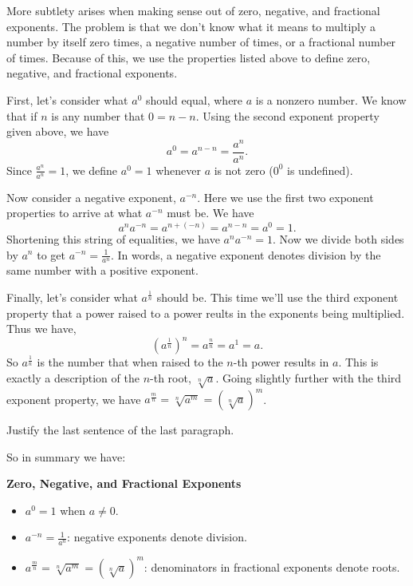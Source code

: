 More subtlety arises when making sense out of zero, negative, and fractional exponents. The problem is that we don't know what it means to multiply a number by itself zero times, a negative number of times, or a fractional number of times. Because of this, we  use the properties listed above to define zero, negative, and fractional exponents.
\par
First, let's consider what $a^0$ should equal, where $a$ is a nonzero number. We know that if $n$ is any number that $0 = n-n$. Using the second exponent property given above, we have
\[
a^0 = a^{n-n} = \frac{a^n}{a^n}.
\]
Since $\frac{a^n}{a^n} = 1$, we define $a^0 = 1$ whenever $a$ is not zero ($0^0$ is undefined).
\par 
Now consider a negative exponent, $a^{-n}$. Here we use the first two exponent properties to arrive at what $a^{-n}$ must be. We have
\[
a^{n}a^{-n} = a^{n+(-n)} = a^{n-n} = a^{0} = 1.
\]
Shortening this string of equalities, we have $a^{n}a^{-n} = 1$. Now we divide both sides by $a^{n}$ to get $a^{-n} = \frac{1}{a^{n}}$. In words, a negative exponent denotes division by the same number with a positive exponent.

\par
 
Finally, let's consider what $a^{\frac{1}{n}}$ should be. This time we'll use the third exponent property that a power raised to a power reults in the exponents being multiplied. Thus we have,
\[
(a^{\frac{1}{n}})^n  = a^{\frac{n}{n}} = a^{1} = a.
\]
So $a^{\frac{1}{n}}$ is the number that when raised to the $n$-th power results in $a$. This is exactly a description of the $n$-th root, $\sqrt[n]{a}$. Going slightly further with the third exponent property, we have $a^\frac{m}{n} = \sqrt[n]{a^m} = (\sqrt[n]{a})^m$.
\par 
\begin{question} Justify the last sentence of the last paragraph.
\end{question}
\par 
So in summary we have:
\begin{tcolorbox}
{\bf Zero, Negative, and Fractional Exponents}
\begin{itemize}
\item $a^0 = 1$ when $a\neq 0$.
\item $a^{-n} = \frac{1}{a^n}$:  \phantom{w}   negative exponents denote division.
\item $a^{\frac{m}{n}} =  \sqrt[n]{a^m} = (\sqrt[n]{a})^m$:  \phantom{w} denominators in fractional exponents \phantom{wwwwwwwwwwwwwww} denote roots.
\end{itemize}
\end{tcolorbox} 


